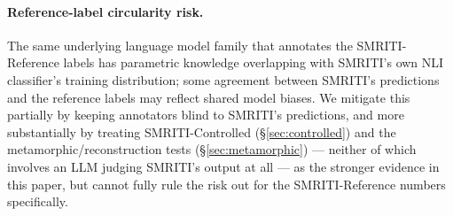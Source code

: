 \paragraph{Reference-label circularity risk.} The same underlying language
model family that annotates the SMRITI-Reference labels has parametric
knowledge overlapping with SMRITI's own NLI classifier's training
distribution; some agreement between SMRITI's predictions and the
reference labels may reflect shared model biases. We mitigate this
partially by keeping annotators blind to SMRITI's predictions, and more
substantially by treating SMRITI-Controlled (\S\ref{sec:controlled}) and
the metamorphic/reconstruction tests (\S\ref{sec:metamorphic}) --- neither
of which involves an LLM judging SMRITI's output at all --- as the stronger
evidence in this paper, but cannot fully rule the risk out for the
SMRITI-Reference numbers specifically.

